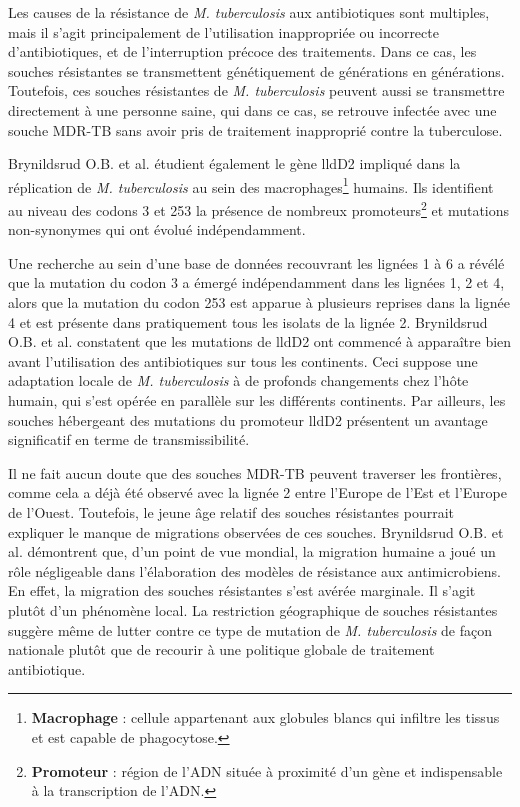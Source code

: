 \documentclass[twoside,a4paper,11pt,frenchb,openany]{report}
\begin{document}
Les causes de la résistance de \textit{M. tuberculosis} aux antibiotiques sont multiples, mais il s'agit principalement de l'utilisation inappropriée ou incorrecte d'antibiotiques, et de l'interruption précoce des traitements. Dans ce cas, les souches résistantes se transmettent génétiquement de générations en générations. Toutefois, ces souches résistantes de \textit{M. tuberculosis} peuvent aussi se transmettre directement à une personne saine, qui dans ce cas, se retrouve infectée avec une souche MDR-TB sans avoir pris de traitement inapproprié contre la tuberculose.

Brynildsrud O.B. et al. étudient également le gène lldD2 impliqué dans la réplication de \textit{M. tuberculosis} au sein des macrophages\footnote{\textbf{Macrophage} : cellule appartenant aux globules blancs qui infiltre les tissus et est capable de phagocytose.} humains. Ils identifient au niveau des codons 3 et 253 la présence de nombreux promoteurs\footnote{\textbf{Promoteur} : région de l'ADN située à proximité d'un gène et indispensable à la transcription de l'ADN.} et mutations non-synonymes qui ont évolué indépendamment.

Une recherche au sein d'une base de données recouvrant les lignées 1 à 6 a révélé que la mutation du codon 3 a émergé indépendamment dans les lignées 1, 2 et 4, alors que la mutation du codon 253 est apparue à plusieurs reprises dans la lignée 4 et est présente dans pratiquement tous les isolats de la lignée 2. Brynildsrud O.B. et al. constatent que les mutations de lldD2 ont commencé à apparaître bien avant l'utilisation des antibiotiques sur tous les continents. Ceci suppose une adaptation locale de \textit{M. tuberculosis} à de profonds changements chez l'hôte humain, qui s'est opérée en parallèle sur les différents continents. Par ailleurs, les souches hébergeant des mutations du promoteur lldD2 présentent un avantage significatif en terme de transmissibilité.

Il ne fait aucun doute que des souches MDR-TB peuvent traverser les frontières, comme cela a déjà été observé avec la lignée 2 entre l'Europe de l'Est et l'Europe de l'Ouest. Toutefois, le jeune âge relatif des souches résistantes pourrait expliquer le manque de migrations observées de ces souches. Brynildsrud O.B. et al. démontrent que, d'un point de vue mondial, la migration humaine a joué un rôle négligeable dans l'élaboration des modèles de résistance aux antimicrobiens. En effet, la migration des souches résistantes s'est avérée marginale. Il s'agit plutôt d'un phénomène local. La restriction géographique de souches résistantes suggère même de lutter contre ce type de mutation de \textit{M. tuberculosis} de façon nationale plutôt que de recourir à une politique globale de traitement antibiotique.
\end{document}
